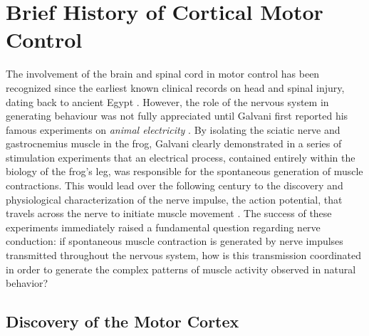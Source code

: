 \section{Brief History of Cortical Motor Control}

The involvement of the brain and spinal cord in motor control has been recognized since the earliest known clinical records on head and spinal injury, dating back to ancient Egypt \cite{Louis1994,VanMiddendorp2010}. However, the role of the nervous system in generating behaviour was not fully appreciated until Galvani first reported his famous experiments on \textit{animal electricity} \cite{Galvani1791}. By isolating the sciatic nerve and gastrocnemius muscle in the frog, Galvani clearly demonstrated in a series of stimulation experiments that an electrical process, contained entirely within the biology of the frog's leg, was responsible for the spontaneous generation of muscle contractions. This would lead over the following century to the discovery and physiological characterization of the nerve impulse, the action potential, that travels across the nerve to initiate muscle movement \cite{DuBois-Reymond1843,Bernstein1868,Schuetze1983}. The success of these experiments immediately raised a fundamental question regarding nerve conduction: if spontaneous muscle contraction is generated by nerve impulses transmitted throughout the nervous system, how is this transmission coordinated in order to generate the complex patterns of muscle activity observed in natural behavior?

\subsection{Discovery of the Motor Cortex}

